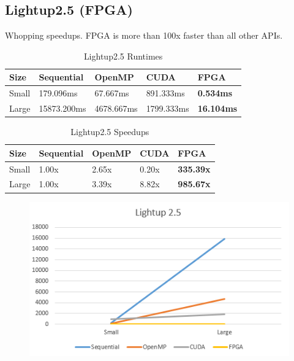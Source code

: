 \documentclass{acm_proc_article-sp}
\begin{document}
\subsection{Lightup2.5 (FPGA)}
Whopping speedups. FPGA is more than 100x faster than all other APIs.
\begin{table}[H]
\centering
\caption{Lightup2.5 Runtimes}
\begin{tabular}{|l|l|l|l|l|} \hline
Size&Sequential&OpenMP&CUDA&FPGA\\ \hline
Small & 179.096ms & 67.667ms & 891.333ms & \textbf{0.534ms} \\ \hline
Large & 15873.200ms & 4678.667ms & 1799.333ms & \textbf{16.104ms} \\ \hline
\end{tabular}
\end{table}
\begin{table}[H]
\centering
\caption{Lightup2.5 Speedups}
\begin{tabular}{|l|l|l|l|l|} \hline
Size&Sequential&OpenMP&CUDA&FPGA\\ \hline
Small & 1.00x & 2.65x & 0.20x & \textbf{335.39x} \\ \hline
Large & 1.00x & 3.39x & 8.82x & \textbf{985.67x} \\ \hline
\end{tabular}
\end{table}
\begin{figure}[H]
  \includegraphics[width=\linewidth,natwidth=476,natheight=282]{lightup25_comparison.png}
  \label{fig:lightup2.5_comparison}
\end{figure}
\end{document}
